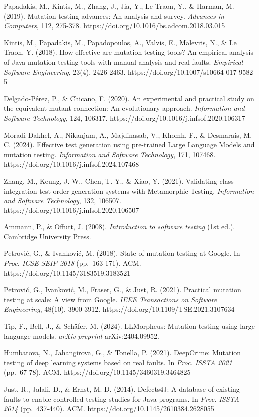 \documentclass[review,12pt,authoryear]{elsarticle}
\begin{document}
Papadakis, M., Kintis, M., Zhang, J., Jia, Y., Le Traon, Y., \& Harman,
M. (2019). Mutation testing advances: An analysis and survey.
\emph{Advances in Computers}, 112, 275-378.
https://doi.org/10.1016/bs.adcom.2018.03.015

Kintis, M., Papadakis, M., Papadopoulos, A., Valvis, E., Malevris, N.,
\& Le Traon, Y. (2018). How effective are mutation testing tools? An
empirical analysis of Java mutation testing tools with manual analysis
and real faults. \emph{Empirical Software Engineering}, 23(4),
2426-2463. https://doi.org/10.1007/s10664-017-9582-5

Delgado-Pérez, P., \& Chicano, F. (2020). An experimental and practical
study on the equivalent mutant connection: An evolutionary approach.
\emph{Information and Software Technology}, 124, 106317.
https://doi.org/10.1016/j.infsof.2020.106317

Moradi Dakhel, A., Nikanjam, A., Majdinasab, V., Khomh, F., \&
Desmarais, M. C. (2024). Effective test generation using pre-trained
Large Language Models and mutation testing. \emph{Information and
Software Technology}, 171, 107468.
https://doi.org/10.1016/j.infsof.2024.107468

Zhang, M., Keung, J. W., Chen, T. Y., \& Xiao, Y. (2021). Validating
class integration test order generation systems with Metamorphic
Testing. \emph{Information and Software Technology}, 132, 106507.
https://doi.org/10.1016/j.infsof.2020.106507

Ammann, P., \& Offutt, J. (2008). \emph{Introduction to software
testing} (1st ed.). Cambridge University Press.

Petrović, G., \& Ivanković, M. (2018). State of mutation testing at
Google. In \emph{Proc. ICSE-SEIP 2018} (pp.~163-171). ACM.
https://doi.org/10.1145/3183519.3183521

Petrović, G., Ivanković, M., Fraser, G., \& Just, R. (2021). Practical
mutation testing at scale: A view from Google. \emph{IEEE Transactions
on Software Engineering}, 48(10), 3900-3912.
https://doi.org/10.1109/TSE.2021.3107634

Tip, F., Bell, J., \& Schäfer, M. (2024). LLMorpheus: Mutation testing
using large language models. \emph{arXiv preprint} arXiv:2404.09952.

Humbatova, N., Jahangirova, G., \& Tonella, P. (2021). DeepCrime:
Mutation testing of deep learning systems based on real faults. In
\emph{Proc. ISSTA 2021} (pp.~67-78). ACM.
https://doi.org/10.1145/3460319.3464825

Just, R., Jalali, D., \& Ernst, M. D. (2014). Defects4J: A database of
existing faults to enable controlled testing studies for Java programs.
In \emph{Proc. ISSTA 2014} (pp.~437-440). ACM.
https://doi.org/10.1145/2610384.2628055
\end{document}

